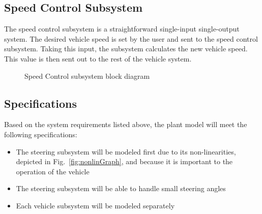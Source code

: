 \documentclass[journal,twoside,web]{ieeecolor}
\begin{document}
  \subsection{Speed Control Subsystem}
  The speed control subsystem is a straightforward single-input single-output system. The desired vehicle speed is set by the user and sent to the speed control subsystem. Taking this input, the subsystem calculates the new vehicle speed. This value is then sent out to the rest of the vehicle system. 
 \begin{figure}[htbp]
    \centering
    \caption{Speed Control subsystem block diagram}
    \label{fig:speedControlModelArchitecture}
 \end{figure}

 \subsection{Specifications}
 Based on the system requirements listed above, the plant model will meet the following specifications:
 \begin{itemize}
    \item The steering subsystem will be modeled first due to its non-linearities, depicted in Fig.~\ref{fig:nonlinGraph}, and because it is important to the operation of the vehicle 
    \item The steering subsystem will be able to handle small steering angles
    \item Each vehicle subsystem will be modeled separately
 \end{itemize}
\end{document}
